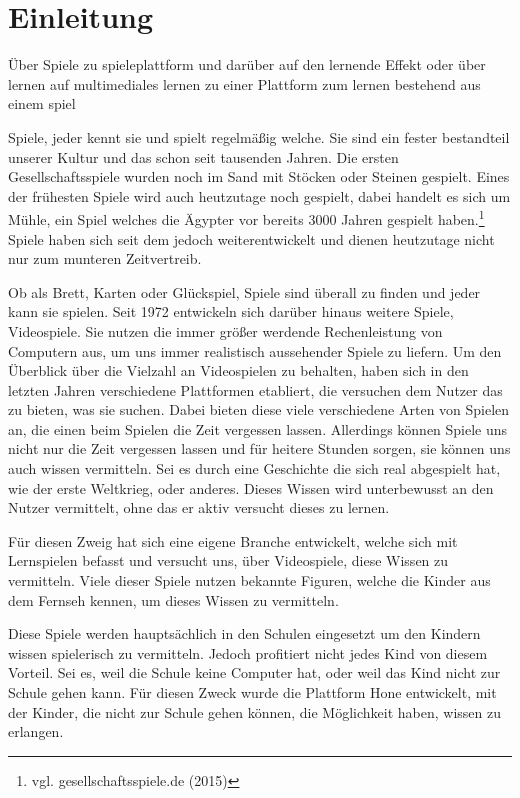 \chapter{Einleitung}

Über Spiele zu spieleplattform und darüber auf den lernende Effekt oder über lernen auf multimediales lernen zu einer Plattform zum lernen bestehend aus einem spiel

Spiele, jeder kennt sie und spielt regelmäßig welche. Sie sind ein fester bestandteil unserer Kultur und das schon seit tausenden Jahren. Die ersten Gesellschaftsspiele wurden noch im Sand mit Stöcken oder Steinen gespielt.  Eines der frühesten Spiele wird auch heutzutage noch gespielt, dabei handelt es sich um Mühle, ein Spiel welches die Ägypter vor bereits 3000 Jahren gespielt haben.\footnote{vgl. gesellschaftsspiele.de \cite{spiele} (2015)} Spiele haben sich seit dem jedoch weiterentwickelt und dienen heutzutage nicht nur zum munteren Zeitvertreib. 

Ob als Brett, Karten oder Glückspiel, Spiele sind überall zu finden und jeder kann sie spielen. Seit 1972 entwickeln sich darüber hinaus weitere Spiele, Videospiele. Sie nutzen die immer größer werdende Rechenleistung von Computern aus, um uns immer realistisch aussehender Spiele zu liefern. 
Um den Überblick über die Vielzahl an Videospielen zu behalten, haben sich in den letzten Jahren verschiedene Plattformen etabliert, die versuchen dem Nutzer das zu bieten, was sie suchen. Dabei bieten diese viele verschiedene Arten von Spielen an, die einen beim Spielen die Zeit vergessen lassen.
Allerdings können Spiele uns nicht nur die Zeit vergessen lassen und für heitere Stunden sorgen, sie können uns auch wissen vermitteln. Sei es durch eine Geschichte die sich real abgespielt hat, wie der erste Weltkrieg, oder anderes. Dieses Wissen wird unterbewusst an den Nutzer vermittelt, ohne das er aktiv versucht dieses zu lernen.

Für diesen Zweig hat sich eine eigene Branche entwickelt, welche sich mit Lernspielen befasst und versucht uns, über Videospiele, diese Wissen zu vermitteln. Viele dieser Spiele nutzen bekannte Figuren, welche die Kinder aus dem Fernseh kennen, um dieses Wissen zu vermitteln.

Diese Spiele werden hauptsächlich in den Schulen eingesetzt um den Kindern wissen spielerisch zu vermitteln. Jedoch profitiert nicht jedes Kind von diesem Vorteil. Sei es, weil die Schule keine Computer hat, oder weil das Kind nicht zur Schule gehen kann. Für diesen Zweck wurde die Plattform Hone entwickelt, mit der Kinder, die nicht zur Schule gehen können, die Möglichkeit haben, wissen zu erlangen. 

